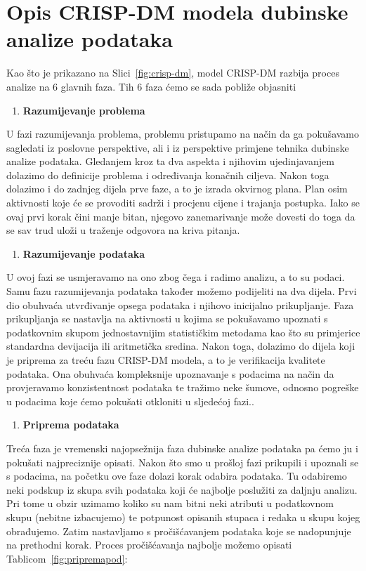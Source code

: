 \documentclass[times, utf8, zavrsni, numeric]{fer}
\begin{document}
\section{Opis CRISP-DM modela dubinske analize podataka}\label{chap:begin}
Kao što je prikazano na Slici~\ref{fig:crisp-dm}, model CRISP-DM razbija proces analize na 6 glavnih faza. Tih 6 faza ćemo se sada pobliže objasniti
\begin{enumerate}
\item \textbf{Razumijevanje problema}
\end{enumerate}
U fazi razumijevanja problema, problemu pristupamo na način da ga pokušavamo sagledati iz poslovne perspektive, ali i iz perspektive primjene tehnika dubinske analize podataka. Gledanjem kroz ta dva aspekta i njihovim ujedinjavanjem dolazimo do definicije problema i određivanja konačnih ciljeva. Nakon toga dolazimo i do zadnjeg dijela prve faze, a to je izrada okvirnog plana. Plan osim aktivnosti koje će se provoditi sadrži i procjenu cijene i trajanja postupka. Iako se ovaj prvi korak čini manje bitan, njegovo zanemarivanje može dovesti do toga da se sav trud uloži u traženje odgovora na kriva pitanja.\cite{crisp1}\cite{crisp2}
\begin{enumerate}[resume]
\item \textbf{Razumijevanje podataka}
\end{enumerate}
U ovoj fazi se usmjeravamo na ono zbog čega i radimo analizu, a to su podaci. Samu fazu razumijevanja podataka također možemo podijeliti na dva dijela. Prvi dio obuhvaća utvrđivanje opsega podataka i njihovo inicijalno prikupljanje. Faza prikupljanja se nastavlja na aktivnosti u kojima se pokušavamo upoznati s podatkovnim skupom jednostavnijim statističkim metodama kao što su primjerice standardna devijacija ili aritmetička sredina. Nakon toga, dolazimo do dijela koji je priprema za treću fazu CRISP-DM modela, a to je verifikacija kvalitete podataka. Ona obuhvaća kompleksnije upoznavanje s podacima na način da provjeravamo konzistentnost podataka te tražimo neke šumove, odnosno pogreške u podacima koje ćemo pokušati otkloniti u sljedećoj fazi..\cite{crisp1}\cite{crisp2}
\begin{enumerate}[resume]
\item \textbf{Priprema podataka}
\end{enumerate}
Treća faza je vremenski najopsežnija faza dubinske analize podataka pa ćemo ju i pokušati najpreciznije opisati. Nakon što smo u prošloj fazi prikupili i upoznali se s podacima, na početku ove faze dolazi korak odabira podataka. Tu odabiremo neki podskup iz skupa svih podataka koji će najbolje poslužiti za daljnju analizu. Pri tome u obzir uzimamo koliko su nam bitni neki atributi u podatkovnom skupu (nebitne izbacujemo) te potpunost opisanih stupaca i redaka u skupu kojeg obrađujemo. Zatim nastavljamo s pročišćavanjem podataka koje se nadopunjuje na prethodni korak. Proces pročišćavanja najbolje možemo opisati Tablicom~\ref{fig:pripremapod}:\\
\end{document}
